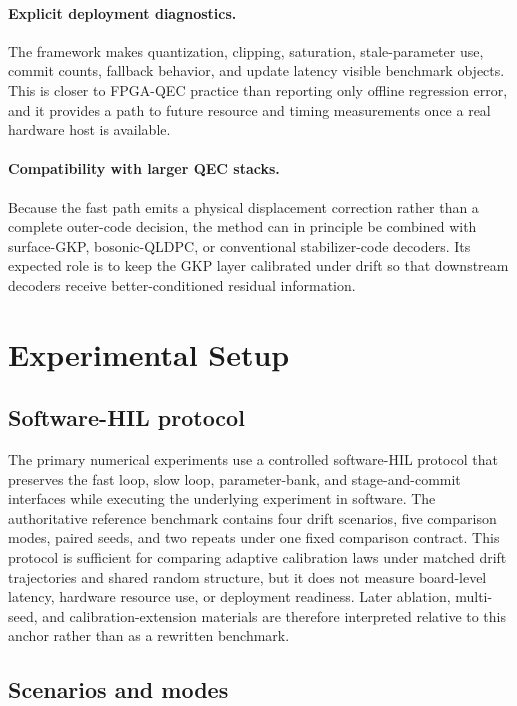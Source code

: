 \documentclass[11pt]{article}
\begin{document}
\paragraph{Explicit deployment diagnostics.}
The framework makes quantization, clipping, saturation, stale-parameter use,
commit counts, fallback behavior, and update latency visible benchmark
objects.  This is closer to FPGA-QEC practice than reporting only offline
regression error, and it provides a path to future resource and timing
measurements once a real hardware host is available.

\paragraph{Compatibility with larger QEC stacks.}
Because the fast path emits a physical displacement correction rather than a
complete outer-code decision, the method can in principle be combined with
surface-GKP, bosonic-QLDPC, or conventional stabilizer-code decoders.  Its
expected role is to keep the GKP layer calibrated under drift so that
downstream decoders receive better-conditioned residual information.

\section{Experimental Setup}

\subsection{Software-HIL protocol}

The primary numerical experiments use a controlled software-HIL
protocol that preserves the fast loop, slow loop, parameter-bank, and
stage-and-commit interfaces while executing the underlying experiment in
software.  The authoritative reference benchmark contains four drift
scenarios, five comparison modes, paired seeds, and two repeats under one fixed
comparison contract.  This protocol is sufficient for comparing adaptive
calibration laws under matched drift trajectories and shared random structure,
but it does not measure board-level latency, hardware resource use, or
deployment readiness.  Later ablation, multi-seed, and calibration-extension
materials are therefore interpreted relative to this anchor rather than as a
rewritten benchmark.

\subsection{Scenarios and modes}
\end{document}

